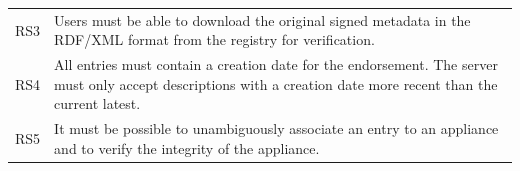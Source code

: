 \begin{table}
\begin{center}
\begin{tabular}{lp{}}
\\ RS3 & Users must be able to download the original signed metadata
in the RDF/XML format from the registry for verification.

\\ RS4 & All entries must contain a creation date for the endorsement.
The server must only accept descriptions with a creation date more
recent than the current latest.

\\ RS5 & It must be possible to unambiguously associate an entry to an
appliance and to verify the integrity of the appliance.

\\
\hline\hline
\end{tabular}
\end{center}
\end{table}
